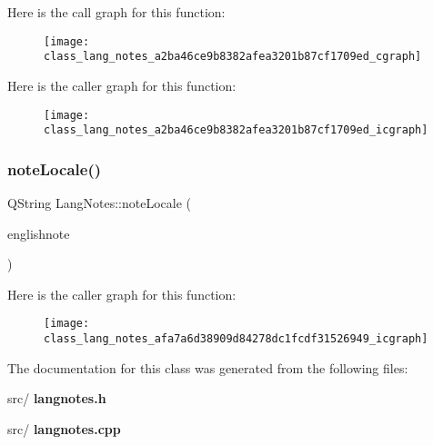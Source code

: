Here is the call graph for this function\+:\nopagebreak
\begin{figure}[H]
\begin{center}
\leavevmode
\texttt{[image: class\_lang\_notes\_a2ba46ce9b8382afea3201b87cf1709ed\_cgraph]}
\end{center}
\end{figure}
Here is the caller graph for this function\+:\nopagebreak
\begin{figure}[H]
\begin{center}
\leavevmode
\texttt{[image: class\_lang\_notes\_a2ba46ce9b8382afea3201b87cf1709ed\_icgraph]}
\end{center}
\end{figure}
\mbox{\label{class_lang_notes_afa7a6d38909d84278dc1fcdf31526949}} 
\subsubsection{note\+Locale()}
{\footnotesize\ttfamily Q\+String Lang\+Notes\+::note\+Locale (\begin{DoxyParamCaption}\item[{Q\+String}]{englishnote }\end{DoxyParamCaption})}

Here is the caller graph for this function\+:\nopagebreak
\begin{figure}[H]
\begin{center}
\leavevmode
\texttt{[image: class\_lang\_notes\_afa7a6d38909d84278dc1fcdf31526949\_icgraph]}
\end{center}
\end{figure}


The documentation for this class was generated from the following files\+:\begin{DoxyCompactItemize}
\item 
src/\textbf{ langnotes.\+h}\item 
src/\textbf{ langnotes.\+cpp}\end{DoxyCompactItemize}
